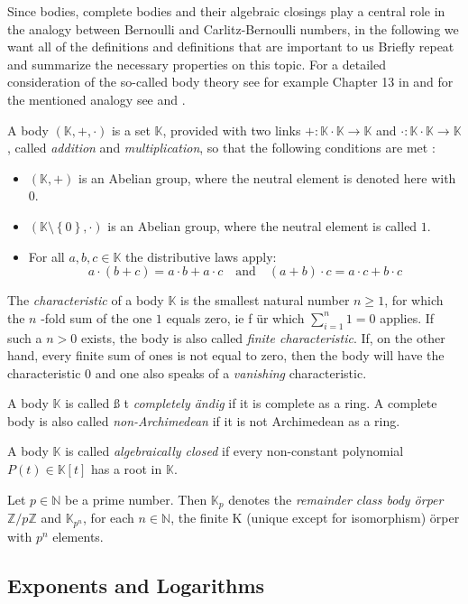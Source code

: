 Since bodies, complete bodies and their algebraic closings play a central role in the analogy between Bernoulli and Carlitz-Bernoulli numbers, in the following we want all of the definitions and definitions that are important to us Briefly repeat and summarize the necessary properties on this topic.
For a detailed consideration of the so-called body theory see for example Chapter 13 in \cite{MA} and for the mentioned analogy see \cite{DG} and \cite{DT}.
\begin{definition}[body]
A body $ (\mathbb{K}, +, \cdot) $ is a set $ \mathbb{K} $, provided with two links $ +: \mathbb{K} \cdot \mathbb{K} \to \mathbb{K} $ and $ \cdot: \mathbb{K} \cdot \mathbb{K} \to \mathbb{K} $, called \textit{addition} and \textit{multiplication}, so that the following conditions are met :
\begin{itemize}
\item $ \left (\mathbb{K}, + \right) $ is an Abelian group, where the neutral element is denoted here with $ 0 $.
\item $ \left (\mathbb{K} \setminus \left \{0 \right \}, \cdot \right) $ is an Abelian group, where the neutral element is called $ 1 $.
\item For all $ a, b, c \in \mathbb{K} $ the distributive laws apply:
$$ a \cdot \left (b + c \right) = a \cdot b + a \cdot c \quad \text{and} \quad
\left (a + b \right) \cdot c = a \cdot c + b \cdot c $$
\end{itemize}
The \textit{characteristic} of a body $ \mathbb{K} $ is the smallest natural number $ n \geq 1 $, for which the $ n $ -fold sum of the one $ 1 $ equals zero, ie f \"ur which $ \sum_{i = 1} ^ n 1 = 0 $ applies.
If such a $ n> 0 $ exists, the body is also called \textit{finite characteristic}. If, on the other hand, every finite sum of ones is not equal to zero, then the body will have the characteristic $ 0 $ and one also speaks of a \textit{vanishing} characteristic.

A body $ \mathbb{K} $ is called \ss{} t \textit{completely \"andig} if
it is complete as a ring. A complete body
is also called \textit{non-Archimedean} if it is not Archimedean as a ring.

A body $ \mathbb{K} $ is called \textit{algebraically closed} if every non-constant polynomial $ P (t) \in \mathbb{K} [t] $
has a root in $ \mathbb{K} $.
\end{definition}
\begin{definition} Let $ p \in \mathbb{N} $ be a prime number. Then $ \mathbb{K} _p $ denotes the \textit{remainder class body \"orper} $ \mathbb{ Z} / p \mathbb{Z} $ and $ \mathbb{K} _{p ^ n} $, for each $ n \in \mathbb{N} $, the finite K (unique except for isomorphism) \"orper with $ p ^ n $ elements.
\end{definition} 



\subsection{Exponents and Logarithms}





